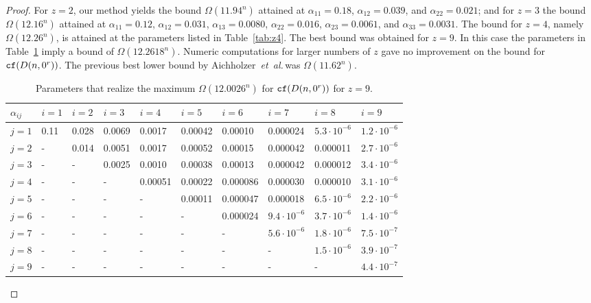 \documentclass[11pt]{article}
\def\etal{{\it et~al.}\,}
\def\cf{{\tt cf}}
\begin{document}
\begin{proof}
For $z=2$, our method yields the bound $\Omega(11.94^n)$
attained at $\alpha_{11}= 0{.}18$, $\alpha_{12}=0{.}039$,
and $\alpha_{22}=0{.}021$; and for $z=3$ the bound
$\Omega(12.16^n)$ attained at $\alpha_{11}=0{.}12$,
$\alpha_{12}=0{.}031$, $\alpha_{13}= 0{.}0080$, $\alpha_{22}=
0{.}016$, $\alpha_{23}=0{.}0061$, and $\alpha_{33}= 0{.}0031$.
The bound for  $z=4$, namely $\Omega(12.26^n)$, is attained at the
parameters  listed in Table~\ref{tab:z4}.
The best bound was obtained for $z=9$. In this case the parameters in
Table~\ref{tab:z9} imply a bound of $\Omega(12.2618^n)$. Numeric
computations for larger numbers of $z$ gave no improvement
on the bound for $\cf(D(n,0^r))$.
The previous best lower bound by Aichholzer~\etal was
$\Omega(11.62^n)$.
\begin{table}
\centering
\begin{tabular}{l||lllllllll}
 $\alpha_{ij}$ & $i=1$ & $i=2$ & $i=3$ & $i=4$ & $i=5$ & $i=6$ & $i=7$ & $i=8$& $i=9$ \\
  \hline
\hline
$j=1$ 	 & 0.11	 &0.028	&0.0069&	0.0017&	0.00042&	0.00010&	0.000024&	$5.3\cdot10^{ -6}$&	$1.2\cdot10^{ -6}$\\
$j=2$	& -	&0.014	&0.0051&	0.0017&	0.00052&	0.00015&	0.000042	&0.000011&	$2.7\cdot10^{ -6}$\\
$j=3$	& -	& -&	0.0025	&0.0010&	0.00038&	0.00013&	0.000042&	0.000012&	$3.4\cdot10^{ -6}$\\
$j=4$	& -	& -	& -	&0.00051	&0.00022	&0.000086	&0.000030	&0.000010	&$3.1\cdot10^{ -6}$\\
$j=5$	& -	& -	& -	& -&	0.00011	&0.000047	&0.000018	&$6.5\cdot10^{ -6}$	&$2.2\cdot10^{ -6}$\\
$j=6$	& -	& -	& -	& -	& -&	0.000024	&$9.4\cdot10^{ -6}$&	$3.7\cdot10^{ -6}$&	$1.4\cdot10^{ -6}$\\
$j=7$	& -	& -	& -	& -	& -	& -	&$5.6\cdot10^{ -6}$&	$1.8\cdot10^{ -6}$	&$7.5\cdot10^{ -7}$\\
$j=8$	& -	& -	& -	& -	& -	& -	& -	&$1.5\cdot10^{ -6}$	&$3.9\cdot10^{ -7}$\\
$j=9$	& -	& -	& -	& -	& -	& -	& -	& -	&$4.4\cdot10^{ -7}$\\
\end{tabular}
\caption{Parameters that realize the maximum
  $\Omega(12.0026^n)$ for
$\cf(D(n,0^r))$ for $z=9$.}
\label{tab:z9}
\end{table}


\end{proof}
\end{document}
